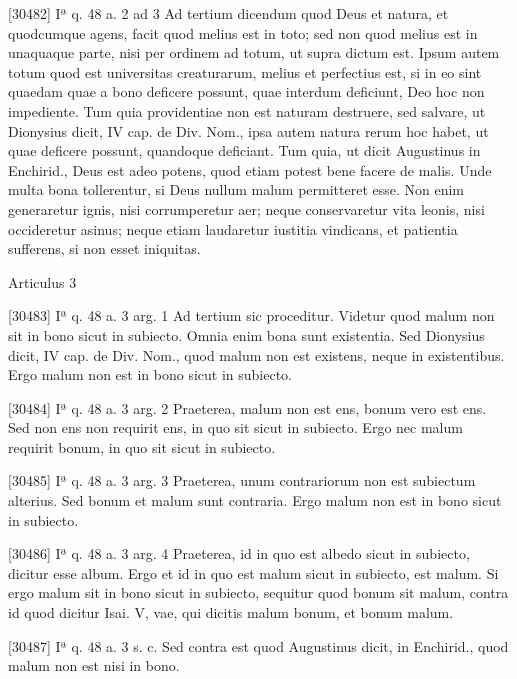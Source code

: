 \documentclass[paper=a4paper,fontsize=10pt,jafontsize=9pt,titlepage]{jlreq}
\begin{document}
[30482] Iª q. 48 a. 2 ad 3 Ad tertium dicendum quod Deus et natura, et quodcumque agens, facit quod melius est in toto; sed non quod melius est in unaquaque parte, nisi per ordinem ad totum, ut supra dictum est. Ipsum autem totum quod est universitas creaturarum, melius et perfectius est, si in eo sint quaedam quae a bono deficere possunt, quae interdum deficiunt, Deo hoc non impediente. Tum quia providentiae non est naturam destruere, sed salvare, ut Dionysius dicit, IV cap. de Div. Nom., ipsa autem natura rerum hoc habet, ut quae deficere possunt, quandoque deficiant. Tum quia, ut dicit Augustinus in Enchirid., Deus est adeo potens, quod etiam potest bene facere de malis. Unde multa bona tollerentur, si Deus nullum malum permitteret esse. Non enim generaretur ignis, nisi corrumperetur aer; neque conservaretur vita leonis, nisi occideretur asinus; neque etiam laudaretur iustitia vindicans, et patientia sufferens, si non esset iniquitas.

Articulus 3

[30483] Iª q. 48 a. 3 arg. 1 Ad tertium sic proceditur. Videtur quod malum non sit in bono sicut in subiecto. Omnia enim bona sunt existentia. Sed Dionysius dicit, IV cap. de Div. Nom., quod malum non est existens, neque in existentibus. Ergo malum non est in bono sicut in subiecto.

[30484] Iª q. 48 a. 3 arg. 2 Praeterea, malum non est ens, bonum vero est ens. Sed non ens non requirit ens, in quo sit sicut in subiecto. Ergo nec malum requirit bonum, in quo sit sicut in subiecto.

[30485] Iª q. 48 a. 3 arg. 3 Praeterea, unum contrariorum non est subiectum alterius. Sed bonum et malum sunt contraria. Ergo malum non est in bono sicut in subiecto.

[30486] Iª q. 48 a. 3 arg. 4 Praeterea, id in quo est albedo sicut in subiecto, dicitur esse album. Ergo et id in quo est malum sicut in subiecto, est malum. Si ergo malum sit in bono sicut in subiecto, sequitur quod bonum sit malum, contra id quod dicitur Isai. V, vae, qui dicitis malum bonum, et bonum malum.

[30487] Iª q. 48 a. 3 s. c. Sed contra est quod Augustinus dicit, in Enchirid., quod malum non est nisi in bono.
\end{document}
